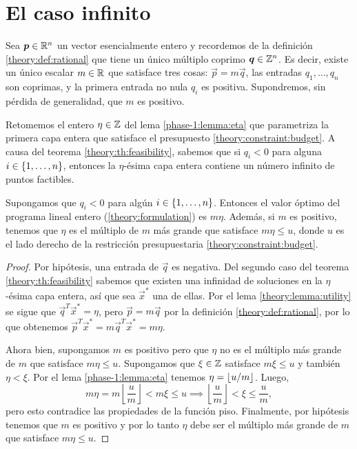 \chapter{El caso infinito}
\label{chap:inf}
\noindent
Sea $\boldsymbol{p} \in \mathbb{R}^n$ un vector esencialmente entero y recordemos de la definición
\ref{theory:def:rational} que tiene un único múltiplo coprimo $\boldsymbol{q} \in \mathbb{Z}^n$. Es decir, existe
un único escalar $m \in \mathbb{R}$ que satisface tres cosas: $\vec{p} = m\vec{q}$, las entradas $q_1,
\ldots, q_n$ son coprimas, y la primera entrada no nula $q_i$ es positiva. Supondremos, sin pérdida
de generalidad, que $m$ es positivo.

Retomemos el entero $\eta \in \mathbb{Z}$ del lema \ref{phase-1:lemma:eta} que parametriza la primera capa
entera que satisface el presupuesto \eqref{theory:constraint:budget}. A causa del teorema
\ref{theory:th:feasibility}, sabemos que si $q_i < 0$ para alguna $i \in \lbrace 1, \ldots, n \rbrace$,
entonces la $\eta$-ésima capa entera contiene un número infinito de puntos factibles.

\begin{corollary}
	\label{cor:inf:obj}
	Supongamos que $q_i < 0$ para algún $i \in \lbrace 1, \ldots, n \rbrace$. Entonces el valor óptimo del
	programa lineal entero (\ref{theory:formulation}) es $m\eta$. Además, si $m$ es positivo,
	tenemos que $\eta$ es el múltiplo de $m$ más grande que satisface $m\eta \leq u$, donde $u$ es
	el lado derecho de la restricción presupuestaria \eqref{theory:constraint:budget}.
\end{corollary}
\begin{proof}
	Por hipótesis, una entrada de $\vec{q}$ es negativa. Del segundo caso del teorema
	\ref{theory:th:feasibility} sabemos que existen una infinidad de soluciones en la $\eta$-ésima
	capa entera, así que sea $\vec{x}^*$ una de ellas. Por el lema \ref{theory:lemma:utility} se
	sigue que $\vec{q}^T\vec{x}^* = \eta$, pero $\vec{p} = m\vec{q}$ por la definición
	\ref{theory:def:rational}, por lo que obtenemos $\vec{p}^T\vec{x}^* = m\vec{q}^T\vec{x}^* =
	m\eta$.

	Ahora bien, supongamos $m$ es positivo pero que $\eta$ no es el múltiplo más grande de $m$ que
	satisface $m\eta \leq u$. Supongamos que $\xi \in \mathbb{Z}$ satisface $m\xi \leq u$ y también $\eta <
	\xi$. Por el lema \ref{phase-1:lemma:eta} tenemos $\eta = \left\lfloor u/m \right\rfloor$. Luego,
	\begin{equation*}
		m\eta = m\left\lfloor \frac{u}{m} \right\rfloor < m\xi \leq u
		\implies \left\lfloor \frac{u}{m} \right\rfloor < \xi \leq \frac{u}{m},
	\end{equation*}
	pero esto contradice las propiedades de la función piso. Finalmente, por hipótesis tenemos que
	$m$ es positivo y por lo tanto $\eta$ debe ser el múltiplo más grande de $m$ que satisface
	$m\eta \leq u$.
\end{proof}

